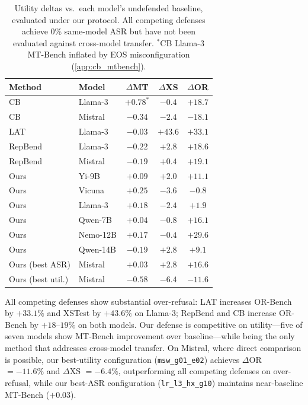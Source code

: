 \begin{table}[t]
\centering
\caption{Utility deltas vs.\ each model's undefended baseline, evaluated under our protocol. All competing defenses achieve 0\% same-model ASR but have not been evaluated against cross-model transfer. $^*$CB Llama-3 MT-Bench inflated by EOS misconfiguration (\cref{app:cb_mtbench}).}
\label{tab:comparison}
\setlength{\tabcolsep}{4pt}
\begin{tabular}{@{}llccc@{}}
\toprule
\textbf{Method} & \textbf{Model} & $\Delta$\textbf{MT} & $\Delta$\textbf{XS} & $\Delta$\textbf{OR} \\
\midrule
CB~\citep{zou2024circuitbreakers}      & Llama-3 & $+0.78^*$ & $-0.4$  & $+18.7$ \\
CB~\citep{zou2024circuitbreakers}      & Mistral & $-0.34$   & $-2.4$  & $-18.1$ \\
LAT~\citep{lat}                        & Llama-3 & $-0.03$   & $+43.6$ & $+33.1$ \\
RepBend~\citep{repbend}                & Llama-3 & $-0.22$   & $+2.8$  & $+18.6$ \\
RepBend~\citep{repbend}                & Mistral & $-0.19$   & $+0.4$  & $+19.1$ \\
\midrule
Ours                                   & Yi-9B   & $+0.09$   & $+2.0$  & $+11.1$ \\
Ours                                   & Vicuna  & $\mathbf{+0.25}$  & $-3.6$  & $\mathbf{-0.8}$ \\
Ours                                   & Llama-3 & $+0.18$   & $-2.4$  & $+1.9$ \\
Ours                                   & Qwen-7B & $+0.04$   & $-0.8$  & $+16.1$ \\
Ours                                   & Nemo-12B& $+0.17$   & $-0.4$  & $+29.6$ \\
Ours                                   & Qwen-14B& $-0.19$   & $+2.8$  & $+9.1$ \\
Ours (best ASR)                        & Mistral & $+0.03$   & $+2.8$  & $+16.6$ \\
Ours (best util.)                      & Mistral & $-0.58$   & $\mathbf{-6.4}$  & $\mathbf{-11.6}$ \\
\bottomrule
\end{tabular}
\setlength{\tabcolsep}{6pt}
\end{table}

All competing defenses show substantial over-refusal: LAT increases OR-Bench by $+33.1\%$ and XSTest by $+43.6\%$ on Llama-3; RepBend and CB increase OR-Bench by $+18$--$19\%$ on both models. Our defense is competitive on utility---five of seven models show MT-Bench improvement over baseline---while being the only method that addresses cross-model transfer. On Mistral, where direct comparison is possible, our best-utility configuration (\texttt{msw\_g01\_e02}) achieves $\Delta$OR $= -11.6\%$ and $\Delta$XS $= -6.4\%$, outperforming all competing defenses on over-refusal, while our best-ASR configuration (\texttt{lr\_l3\_hx\_g10}) maintains near-baseline MT-Bench ($+0.03$).
